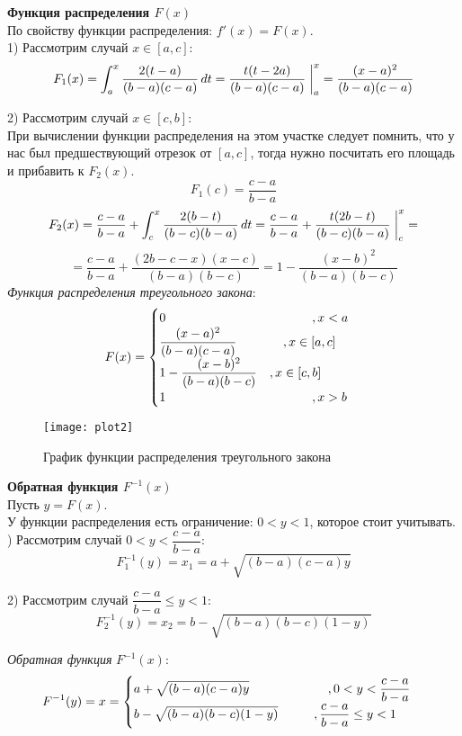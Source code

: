 \textbf{Функция распределения $F(x)$}\\

По свойству функции распределения: $f'(x) = F(x)$.\\

1) Рассмотрим случай $x \in [a,c]:$
\[ F_1(x) = \int_{a}^{x} \dfrac{2(t-a)}{(b-a)(c-a)} \,dt = \dfrac{t(t-2a)}{(b-a)(c-a)}\at_{a}^{x} = \dfrac{(x-a)^2}{(b-a)(c-a)} \]

2) Рассмотрим случай $x \in [c,b]$:\\
\newline
При вычислении функции распределения на этом участке следует помнить, что у нас был предшествующий отрезок от $[a,c]$, тогда нужно посчитать его площадь и прибавить к $F_2(x)$.
\[ F_1(c) = \dfrac{c-a}{b-a}\]
\[ F_2(x) = \dfrac{c-a}{b-a} + \int_{c}^{x} \dfrac{2(b-t)}{(b-c)(b-a)} \,dt = \dfrac{c-a}{b-a} + \dfrac{t(2b-t)}{(b-c)(b-a)}\at_{c}^{x} = \]
\[ = \dfrac{c-a}{b-a} + \dfrac{(2b-c-x)(x-c)}{(b-a)(b-c)} = 1 - \dfrac{(x-b)^2}{(b-a)(b-c)} \]
\newline
\textit{Функция распределения треугольного закона}:
\begin{align*}
	F(x) =
	\begin{cases}
		0 \hspace{4.1cm} , x < a\\
		\dfrac{(x-a)^2}{(b-a)(c-a)} \hspace{1.3cm} , x \in [a,c]\\
		1 - \dfrac{(x-b)^2}{(b-a)(b-c)} \quad , x \in [c,b]\\
		1 \hspace{4.1cm} , x > b\\
	\end{cases}
\end{align*}

\newpage
\begin{figure}[h]
	\centering \texttt{[image: plot2]}
	\caption{График функции распределения треугольного закона}
\end{figure}

\textbf{Обратная функция $F^{-1}(x)$}\\

Пусть $y = F(x)$.\\
У функции распределения есть ограничение: $0 < y < 1$, которое стоит учитывать.\\
) Рассмотрим случай $0 < y < \dfrac{c-a}{b-a}$:
\[ F_1^{-1}(y) = x_1 = a + \sqrt{(b-a)(c-a)y} \]

2) Рассмотрим случай $\dfrac{c-a}{b-a} \leq y < 1$:
\[ F_2^{-1}(y) = x_2 = b - \sqrt{(b-a)(b-c)(1-y)} \]

\textit{Обратная функция} $F^{-1}(x)$:
\begin{align*}
	F^{-1}(y) = x =
	\begin{cases}
		a + \sqrt{(b-a)(c-a)y} \hspace{2.2cm} , 0 < y < \dfrac{c-a}{b-a}\\
		b - \sqrt{(b-a)(b-c)(1-y)} \hspace{1cm} , \dfrac{c-a}{b-a} \leq y < 1\\
	\end{cases}
\end{align*}